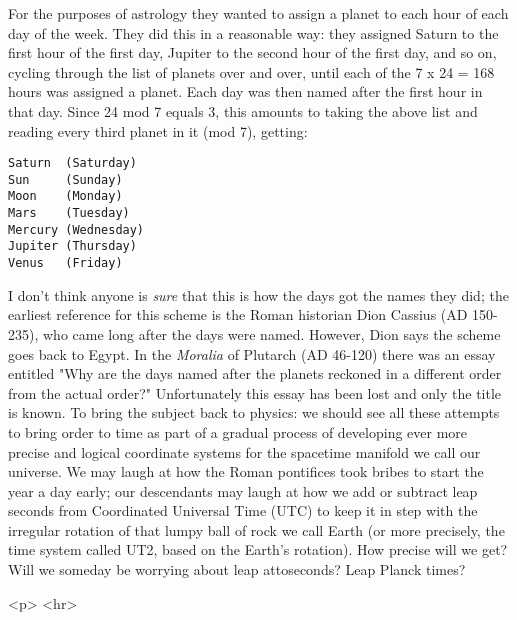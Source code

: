For the purposes of astrology they wanted to assign a planet to
each hour of each day of the week.  They did this in a reasonable
way: they assigned Saturn to the first hour of the first day,
Jupiter to the second hour of the first day, and so on, cycling
through the list of planets over and over, until each of the 
7 x 24 = 168 hours was assigned a planet.   Each day was then
named after the first hour in that day.   Since 24 mod 7 equals
3, this amounts to taking the above list and reading every third
planet in it (mod 7), getting:
\begin{verbatim}
Saturn  (Saturday)
Sun     (Sunday)
Moon    (Monday)
Mars    (Tuesday)
Mercury (Wednesday)
Jupiter (Thursday)
Venus   (Friday)
\end{verbatim}
    
I don't think anyone is \emph{sure} that this is how the days got the
names they did; the earliest reference for this scheme is the 
Roman historian Dion Cassius (AD 150-235), who came long after the
days were named.  However, Dion says the scheme goes back to Egypt.
In the \emph{Moralia} of Plutarch (AD 46-120) there was an essay entitled
"Why are the days named after the planets reckoned in a different order
from the actual order?"  Unfortunately this essay has been lost and
only the title is known.  
To bring the subject back to physics: we should see all these attempts
to bring order to time as part of a gradual process of developing
ever more precise and logical coordinate systems for the spacetime
manifold we call our universe.  We may laugh at how the Roman pontifices
took bribes to start the year a day early; our descendants may laugh
at how we add or subtract leap seconds from Coordinated Universal 
Time (UTC) to keep it in step with the irregular rotation of that lumpy 
ball of rock we call Earth (or more precisely, the time system called
UT2, based on the Earth's rotation).  How precise will we get?  Will 
we someday be worrying about leap attoseconds?  Leap Planck times?





<p> <hr>



